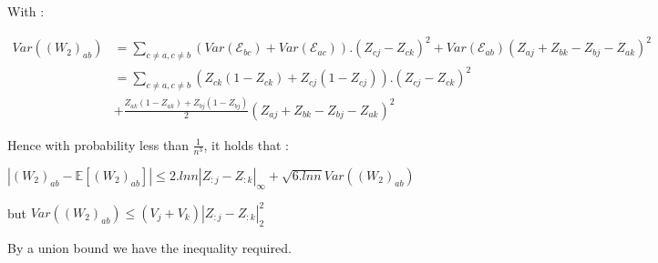 With :  
\begin{center}
\begin{align*}
Var((W_2)_{ab}) &= \sum_{c \neq a, c\neq b} (Var(\mathcal{E}_{bc}) + Var(\mathcal{E}_{ac})).(Z_{cj} - Z_{ck})^2 + Var(\mathcal{E}_{ab})(Z_{aj} + Z_{bk} - Z_{bj} - Z_{ak})^2\\&=\sum_{c \neq a, c\neq b} (Z_{ck}(1-Z_{ck}) + Z_{cj}(1-Z_{cj})).(Z_{cj} - Z_{ck})^2 \\ &+ \frac{Z_{ak}(1-Z_{ak})+Z_{bj}(1-Z_{bj})}{2}(Z_{aj} + Z_{bk} - Z_{bj} - Z_{ak})^2 
\end{align*}
\end{center}

Hence with probability less than $\frac{1}{n^3}$, it holds that :

\begin{center}

$|(W_2)_{ab} - \mathbb{E}[(W_2)_{ab}]| \le 2.lnn|Z_{:j} - Z_{:k}|_{\infty} + \sqrt{6.lnn} Var((W_2)_{ab})$

but $Var((W_2)_{ab}) \le (V_j+V_k)|Z_{:j} - Z_{:k}|_2^2$

By a union bound we have the inequality required.

\end{center}